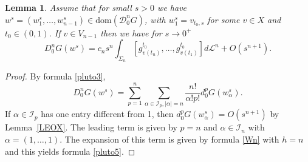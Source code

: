 \documentclass[12pt, reqno]{amsart}
\theoremstyle{plain}
\newtheorem {lemma}[theorem]{Lemma}
\theoremstyle{definition}
\theoremstyle{remark}
\numberwithin{equation}{section}
\renewcommand{\L}{\mathcal{L}}
\newcommand{\I}{\mathcal{I}}
\newcommand{\0}{\theta}
\renewcommand{\a}{\alpha}
\newcommand{\1}{{-1}}
\renewcommand{\=}{\coloneqq}
\renewcommand{\.}{\dots}
\newcommand{\mc}{\mathcal}
\newcommand{\dom}{\mathrm{dom}}
\begin{document}
\begin{lemma} Assume that for small $s>0$ we have $w^s=
(w_1^s,\ldots, w_{n-1}^s) \in \dom(\mc D_0^n G)$, with $w_1^s =  v _{t_0,s}$ for some $v\in X$ and $t_0\in (0,1)$.
 If $v\in V_{n-1}$ then we have  for $s\to0^+$
\begin{equation} \label{pluto5}
 D_0^nG(w^s) =  c_n  s^n  \int_{\Sigma_n }[ g_{v(t_n)}^{t_0} , \., g_{v(t_1)}^{t_0}] d\L^n + O(s^{n+1}). 
\end{equation}
\end{lemma}

\begin{proof} By formula \eqref{pluto3},
\[
 D_0^nG(w^s ) =\sum_{p=1}^n\sum_{\a\in\I_p, |\a|=n}\frac{n!}{\a!p!} d_0^p G( w^s_\alpha).
\]
 If $\alpha\in \I_p$ has  one entry different from 1, then $d_0^p G( w^s_\alpha)= O(s^{n+1})$ by Lemma~\ref{LEOX}.
 The leading term is given by $p=n$ and $\a\in \I_n$ with $\a=(1,\dots,1)$.
 The expansion of this term is given by 
 formula \eqref{Wn} with $h=n$ and this yields formula \eqref{pluto5}.
 
 
 
\end{proof}  





















 
 
 
 
 
 
 
 
 
 
 
 
 
 
 
 
 
 
 
 
 
 
 
 
 
 
 
 
 
 
 
 
 
 
 
 
 
 
 
 
 
 
 
 
\end{document}
